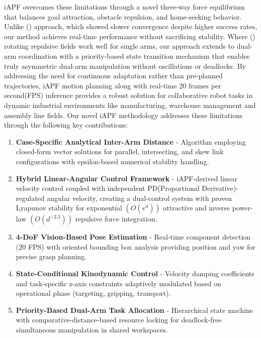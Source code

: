 \documentclass[utf8]{FrontiersinHarvard}
\begin{document}
iAPF overcomes these limitations through a novel three-way force equilibrium that balances goal attraction, obstacle repulsion, and home-seeking behavior. Unlike (\citet{Naeem, Naeem1}) approach, which showed slower convergence despite higher success rates, our method achieves real-time performance without sacrificing stability. Where (\citet{Health_robot, health_robot1}) rotating repulsive fields work well for single arms, our approach extends to dual-arm coordination with a priority-based state transition mechanism that enables truly asymmetric dual-arm manipulation without oscillations or deadlocks. By addressing the need for continuous adaptation rather than pre-planned trajectories, iAPF motion planning along with real-time 20 frames per second(FPS) inference provides a robust solution for collaborative robot tasks in dynamic industrial environments like manufacturing, warehouse management and assembly line fields. Our novel iAPF methodology addresses these limitations through the following key contributions:

\begin{enumerate}
    \item \textbf{Case-Specific Analytical Inter-Arm Distance} - Algorithm employing closed-form vector solutions for parallel, intersecting, and skew link configurations with epsilon-based numerical stability handling.
    \item \textbf{Hybrid Linear-Angular Control Framework} - iAPF-derived linear velocity control coupled with independent PD(Proportional Derivative)-regulated angular velocity, creating a dual-control system with proven Lyapunov stability for exponential $(O(e^d))$ attractive and inverse power-law $(O(d^{-2.3}))$ repulsive force integration.
    \item \textbf{4-DoF Vision-Based Pose Estimation} - Real-time component detection (20 FPS) with oriented bounding box analysis providing position and yaw for precise grasp planning.
    \item \textbf{State-Conditional Kinodynamic Control} - Velocity damping coefficients and task-specific z-axis constraints adaptively modulated based on operational phase (targeting, gripping, transport).
    \item \textbf{Priority-Based Dual-Arm Task Allocation} - Hierarchical state machine with comparative-distance-based resource locking for deadlock-free simultaneous manipulation in shared workspaces. 
\end{enumerate}
\end{document}
